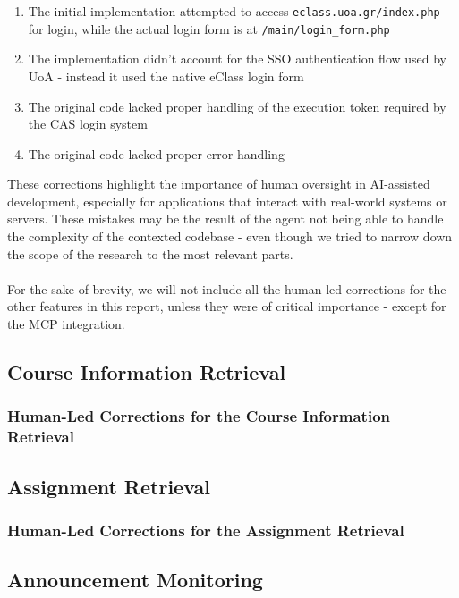 \documentclass[11pt,a4paper]{article}
\begin{document}
\begin{enumerate}
    \item The initial implementation attempted to access \texttt{eclass.uoa.gr/index.php} for login, while the actual login form is at \texttt{/main/login\_form.php}
    \item The implementation didn't account for the SSO authentication flow used by UoA - instead it used the native eClass login form
    \item The original code lacked proper handling of the execution token required by the CAS login system
    \item The original code lacked proper error handling
\end{enumerate}
These corrections highlight the importance of human oversight in AI-assisted development, especially for applications that interact with real-world systems or servers. These mistakes may be the result of the agent not being able to handle the complexity of the contexted codebase - even though we tried to narrow down the scope of the research to the most relevant parts.\\\\
For the sake of brevity, we will not include all the human-led corrections for the other features in this report, unless they were of critical importance - except for the MCP integration.
\subsection{Course Information Retrieval}

\subsubsection{Human-Led Corrections for the Course Information Retrieval}

\subsection{Assignment Retrieval}

\subsubsection{Human-Led Corrections for the Assignment Retrieval}

\subsection{Announcement Monitoring}
\end{document}
